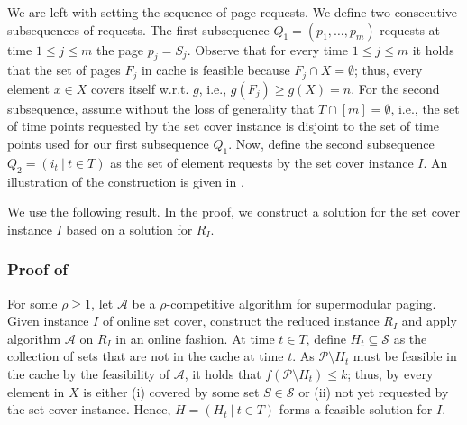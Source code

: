 \documentclass[11pt]{article}
\newcommand{\cA}{{\mathcal{A}}}
\newcommand{\cP}{{\mathcal{P}}}
\newcommand{\cS}{{\mathcal{S}}}
\begin{document}

We are left with setting the sequence of page requests. We define two consecutive subsequences of requests. The first subsequence $Q_1 = (p_1,\ldots, p_m)$ requests at time $1 \leq j \leq m$ the page $p_j = S_j$. Observe that for every time $1 \leq j \leq m$ it holds that the set of pages $F_j$ in cache is feasible because $F_j \cap X = \emptyset$; thus, every element $x \in X$ covers itself w.r.t. $g$, i.e., $g(F_j) \geq g(X) = n$. 
For the second subsequence, assume without the loss of generality that $T \cap [m] = \emptyset$, i.e., the set of time points requested by the set cover instance is disjoint to the set of time points used for our first subsequence $Q_1$. Now, define the second subsequence $Q_2 = \left(i_t  ~|~ t \in T\right)$ as the set of element requests by the set cover instance $I$. %
An illustration of the construction is given in . 


We use the following result. In the proof, we construct a solution for the set cover instance $I$ based on a solution for $R_I$.


\subsubsection*{Proof of }

For some $\rho \geq 1$,	let $\cA$ be a $\rho$-competitive algorithm for \textnormal{supermodular paging}. Given instance $I$ of online set cover, construct the reduced instance $R_I$ and apply algorithm $\cA$ on $R_I$ in an online fashion. At time $t \in T$, define $H_t \subseteq \cS$ as the collection of sets that are not in the cache at time $t$. As $\cP \setminus H_t$ must be feasible in the cache by the feasibility of $\cA$, it holds that $f(\cP \setminus H_t) \leq k$; thus, by  every element in $X$ is either (i) covered by some set $S \in \cS$ or (ii) not yet requested by the set cover instance. Hence, $H = (H_t~|~t \in T)$ forms a feasible solution for $I$.  
	
\end{document}
